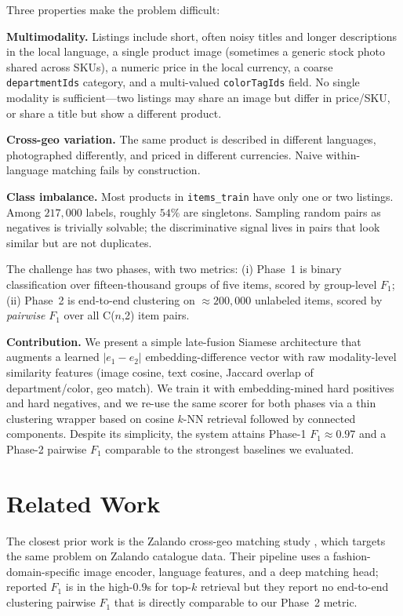 \documentclass[10pt,conference]{IEEEtran}
\begin{document}
Three properties make the problem difficult:

\textbf{Multimodality.} Listings include short, often noisy titles and longer
descriptions in the local language, a single product image (sometimes a
generic stock photo shared across SKUs), a numeric price in the local
currency, a coarse \texttt{departmentIds} category, and a multi-valued
\texttt{colorTagIds} field. No single modality is sufficient---two listings
may share an image but differ in price/SKU, or share a title but show a
different product.

\textbf{Cross-geo variation.} The same product is described in different
languages, photographed differently, and priced in different currencies.
Naive within-language matching fails by construction.

\textbf{Class imbalance.} Most products in
\texttt{items\_train} have only one or two listings. Among $217{,}000$
labels, roughly $54\%$ are singletons. Sampling random pairs as negatives is
trivially solvable; the discriminative signal lives in pairs that look
similar but are not duplicates.

The challenge has two phases, with two metrics:
(i) Phase~1 is binary classification over fifteen-thousand groups of five
items, scored by group-level $F_1$;
(ii) Phase~2 is end-to-end clustering on $\approx 200{,}000$
unlabeled items, scored by \emph{pairwise} $F_1$ over all C($n$,2) item pairs.

\textbf{Contribution.} We present a simple late-fusion Siamese architecture
that augments a learned $|e_1 - e_2|$ embedding-difference vector with raw
modality-level similarity features (image cosine, text cosine, Jaccard
overlap of department/color, geo match). We train it with embedding-mined
hard positives and hard negatives, and we re-use the same scorer for both
phases via a thin clustering wrapper based on cosine $k$-NN retrieval
followed by connected components. Despite its simplicity, the system attains
Phase-1 $F_1 \approx 0.97$ and a Phase-2 pairwise $F_1$ comparable to the
strongest baselines we evaluated.

\section{Related Work}
\label{sec:related}

The closest prior work is the Zalando cross-geo matching study
\cite{zalando_crossgeo}, which targets the same problem on Zalando catalogue
data. Their pipeline uses a fashion-domain-specific image encoder, language
features, and a deep matching head; reported $F_1$ is in the high-$0.9$s for
top-$k$ retrieval but they report no end-to-end clustering pairwise $F_1$
that is directly comparable to our Phase~2 metric.
\end{document}
